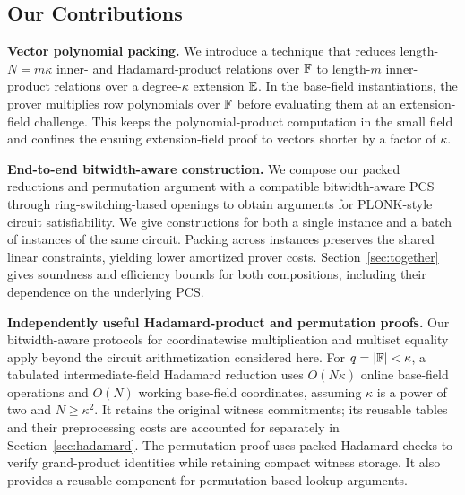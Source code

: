 \subsection{Our Contributions}

\noindent\textbf{Vector polynomial packing.}
    We introduce a technique that reduces length-\(N=m\kappa\)
    inner- and Hadamard-product relations over \({\mathbb{F}}\) to
    length-\(m\) inner-product relations over a degree-\(\kappa\)
    extension \(\mathbb{E}\).
    In the base-field instantiations, the prover multiplies row polynomials over \({\mathbb{F}}\) before
    evaluating them at an extension-field challenge.
    This keeps the polynomial-product computation in the small field
    and confines the ensuing extension-field proof to vectors shorter
    by a factor of \(\kappa\).

\medskip \noindent \textbf{End-to-end bitwidth-aware construction.}
    We compose our packed reductions and permutation argument with
    a compatible bitwidth-aware PCS through ring-switching-based
    openings to obtain arguments for PLONK-style circuit satisfiability.
    We give constructions for both a single instance and a batch of
    instances of the same circuit.
    Packing across instances preserves the shared linear constraints,
    yielding lower amortized prover costs.
    Section~\ref{sec:together} gives soundness and efficiency bounds
    for both compositions, including their dependence on the
    underlying PCS.

\medskip\noindent \textbf{Independently useful Hadamard-product and permutation proofs.}
    Our bitwidth-aware protocols for coordinatewise multiplication
    and multiset equality apply beyond the circuit arithmetization
    considered here.
    For \(q=|{\mathbb{F}}|<\kappa\), a tabulated intermediate-field
    Hadamard reduction uses \(O(N\kappa)\) online base-field
    operations and \(O(N)\) working base-field coordinates,
    assuming \(\kappa\) is a power of two and \(N\geq\kappa^2\).
    It retains the original witness commitments; its reusable
    tables and their preprocessing costs are accounted for
    separately in Section~\ref{sec:hadamard}.
    The permutation proof uses packed Hadamard checks to verify
    grand-product identities while retaining compact witness storage.
    It also provides a reusable component for permutation-based
    lookup arguments.
